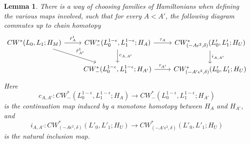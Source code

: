 \documentclass{amsart}
\newtheorem{lemma}[theorem]{Lemma}
\numberwithin{equation}{section}
\numberwithin{figure}{section}
\begin{document}
\begin{lemma}\label{linear restriction homomorphism is compatible with inclusion maps of sub-complexes}
	There is a way of choosing families of Hamiltonians when defining the various maps involved, such that for every $A < A'$, the following diagram commutes up to chain homotopy
\begin{equation}
\begin{tikzcd}
CW^{*}(L_{0}, L_{1}; H_{M}) \arrow[r, "\tilde{r}^{1}_{A}"] \arrow[rd, "\tilde{r}^{1}_{A'}"] & CW^{*}_{-}(L_{0}^{1-\epsilon}, L_{1}^{1-\epsilon}; H_{A}) \arrow[r, "\tau_{A}"] \arrow[d, "c_{A, A'}"] & CW^{*}_{(-A\epsilon^{2}, \delta)}(L'_{0}, L'_{1}; H_{U}) \arrow[d, "i_{A, A'}"]\\
	& CW^{*}_{-}(L_{0}^{1-\epsilon}, L_{1}^{1-\epsilon}; H_{A'}) \arrow[r, "\tau_{A'}"] & CW^{*}_{(-A'\epsilon^{2}, \delta)}(L'_{0}, L'_{1}; H_{U})
\end{tikzcd}
\end{equation}
Here
\begin{equation*}
c_{A, A'}: CW^{*}_{-}(L_{0}^{1-\epsilon}, L_{1}^{1-\epsilon}; H_{A}) \to CW^{*}_{-}(L_{0}^{1-\epsilon}, L_{1}^{1-\epsilon}; H_{A'})
\end{equation*}
is the continuation map induced by a monotone homotopy between $H_{A}$ and $H_{A'}$, and
\begin{equation*}
i_{A, A'}: CW^{*}_{(-A\epsilon^{2}, \delta)}(L'_{0}, L'_{1}; H_{U}) \to CW^{*}_{(-A'\epsilon^{2}, \delta)}(L'_{0}, L'_{1}; H_{U})
\end{equation*}
is the natural inclusion map.
\end{lemma}
\end{document}
